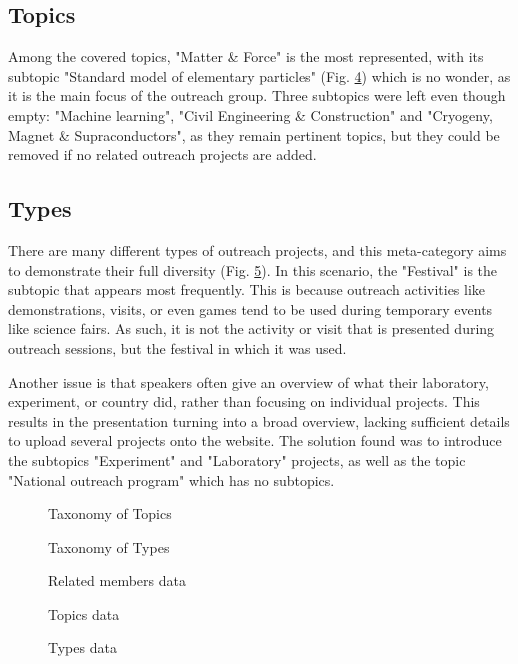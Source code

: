 \subsection*{Topics}
Among the covered topics, "Matter \& Force" is the most represented, with its subtopic "Standard model of elementary particles" (Fig. \ref{fig:topics}) which is no wonder, as it is the main focus of the outreach group. Three subtopics were left even though empty: "Machine learning", "Civil Engineering \& Construction" and "Cryogeny, Magnet \& Supraconductors", as they remain pertinent topics, but they could be removed if no related outreach projects are added.  

\subsection*{Types}
There are many different types of outreach projects, and this meta-category aims to demonstrate their full diversity (Fig. \ref{fig:types}). In this scenario, the "Festival" is the subtopic that appears most frequently. This is because outreach activities like demonstrations, visits, or even games tend to be used during temporary events like science fairs. As such, it is not the activity or visit that is presented during outreach sessions, but the festival in which it was used. 

Another issue is that speakers often give an overview of what their laboratory, experiment, or country did, rather than focusing on individual projects. This results in the presentation turning into a broad overview, lacking sufficient details to upload several projects onto the website. The solution found was to introduce the subtopics "Experiment" and "Laboratory" projects, as well as the topic "National outreach program" which has no subtopics.

\begin{figure}[p]
    \centering
    
    \caption{Taxonomy of Topics}
    \label{fig:Topics_category}
\end{figure}


\begin{figure}[p]
    \centering
    
    \caption{Taxonomy of Types}
    \label{fig:Types_category}
\end{figure}

\begin{figure}
    \centering
    
    \caption{Related members data}
    \label{fig:members}
\end{figure}

\begin{figure}
    \centering
    
    \caption{Topics data}
    \label{fig:topics}
\end{figure}

\begin{figure}
    \centering
    
    \caption{Types data}
    \label{fig:types}
\end{figure}